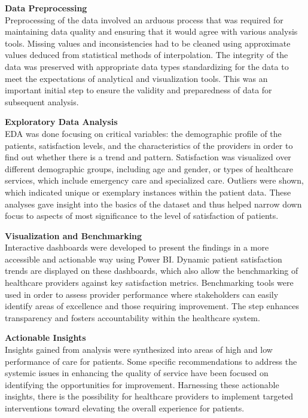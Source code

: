 \vspace{1em}

\textbf{Data Preprocessing}\\
Preprocessing of the data involved an arduous process that was required for maintaining data quality and ensuring that it would agree with various analysis tools. Missing values and inconsistencies had to be cleaned using approximate values deduced from statistical methods of interpolation. The integrity of the data was preserved with appropriate data types standardizing for the data to meet the expectations of analytical and visualization tools. This was an important initial step to ensure the validity and preparedness of data for subsequent analysis.

\vspace{1em}

\textbf{Exploratory Data Analysis}\\
EDA was done focusing on critical variables: the demographic profile of the patients, satisfaction levels, and the characteristics of the providers in order to find out whether there is a trend and pattern. Satisfaction was visualized over different demographic groups, including age and gender, or types of healthcare services, which include emergency care and specialized care. Outliers were shown, which indicated unique or exemplary instances within the patient data. These analyses gave insight into the basics of the dataset and thus helped narrow down focus to aspects of most significance to the level of satisfaction of patients.

\vspace{2em}


\textbf{Visualization and Benchmarking}\\
Interactive dashboards were developed to present the findings in a more accessible and actionable way using Power BI. Dynamic patient satisfaction trends are displayed on these dashboards, which also allow the benchmarking of healthcare providers against key satisfaction metrics. Benchmarking tools were used in order to assess provider performance where stakeholders can easily identify areas of excellence and those requiring improvement. The step enhances transparency and fosters accountability within the healthcare system.

\vspace{1em}

\textbf{Actionable Insights}\\
Insights gained from analysis were synthesized into areas of high and low performance of care for patients. Some specific recommendations to address the systemic issues in enhancing the quality of service have been focused on identifying the opportunities for improvement. Harnessing these actionable insights, there is the possibility for healthcare providers to implement targeted interventions toward elevating the overall experience for patients.

